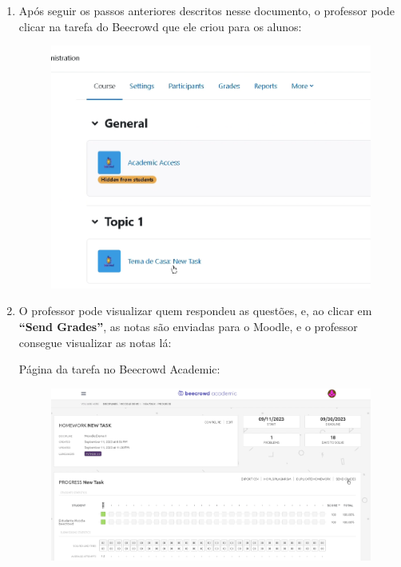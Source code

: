\begin{enumerate}
    \item Após seguir os passos anteriores descritos nesse documento, o professor pode clicar na tarefa do Beecrowd que ele criou para os alunos:

    \begin{figure}[H]
        \centering
            \includegraphics[scale=0.4]{pictures/apendices/apendice_b_24.png}
    \end{figure}

    \item O professor pode visualizar quem respondeu as questões, e, ao clicar em \textbf{“Send Grades”}, as notas são enviadas para o Moodle, e o professor consegue visualizar as notas lá:

    Página da tarefa no Beecrowd Academic:

    \begin{figure}[H]
        \centering
            \includegraphics[scale=0.385]{pictures/apendices/apendice_b_25.png}
    \end{figure}


\end{enumerate}
